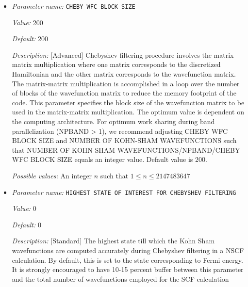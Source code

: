 \begin{itemize}
{\it Possible values:} A floating point number $v$ such that $0 \leq v \leq 2000$
\item {\it Parameter name:} {\tt CHEBY WFC BLOCK SIZE}
\label{parameters:SCF parameters/Eigen_2dsolver parameters/CHEBY WFC BLOCK SIZE}
\label{parameters:SCF_20parameters/Eigen_2dsolver_20parameters/CHEBY_20WFC_20BLOCK_20SIZE}


{\it Value:} 200


{\it Default:} 200


{\it Description:} [Advanced] Chebyshev filtering procedure involves the matrix-matrix multiplication where one matrix corresponds to the discretized Hamiltonian and the other matrix corresponds to the wavefunction matrix. The matrix-matrix multiplication is accomplished in a loop over the number of blocks of the wavefunction matrix to reduce the memory footprint of the code. This parameter specifies the block size of the wavefunction matrix to be used in the matrix-matrix multiplication. The optimum value is dependent on the computing architecture. For optimum work sharing during band parallelization (NPBAND > 1), we recommend adjusting CHEBY WFC BLOCK SIZE and NUMBER OF KOHN-SHAM WAVEFUNCTIONS such that NUMBER OF KOHN-SHAM WAVEFUNCTIONS/NPBAND/CHEBY WFC BLOCK SIZE equals an integer value. Default value is 200.


{\it Possible values:} An integer $n$ such that $1\leq n \leq 2147483647$
\item {\it Parameter name:} {\tt HIGHEST STATE OF INTEREST FOR CHEBYSHEV FILTERING}
\label{parameters:SCF parameters/Eigen_2dsolver parameters/HIGHEST STATE OF INTEREST FOR CHEBYSHEV FILTERING}
\label{parameters:SCF_20parameters/Eigen_2dsolver_20parameters/HIGHEST_20STATE_20OF_20INTEREST_20FOR_20CHEBYSHEV_20FILTERING}


{\it Value:} 0


{\it Default:} 0


{\it Description:} [Standard] The highest state till which the Kohn Sham wavefunctions are computed accurately during Chebyshev filtering in a NSCF calculation. By default, this is set to the state corresponding to Fermi energy. It is strongly encouraged to have 10-15 percent buffer between this parameter and the total number of wavefunctions employed for the SCF calculation 



\end{itemize}
